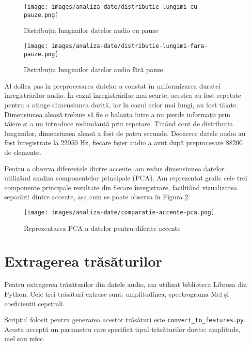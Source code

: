 \begin{figure}
   \begin{minipage}{0.48\textwidth}
     \centering
     \texttt{[image: images/analiza-date/distributie-lungimi-cu-pauze.png]}
     \caption{Distribuția lungimilor datelor audio cu pauze}\label{fig:distribuatiaLungimilor1}
   \end{minipage}\hfill
   \begin{minipage}{0.48\textwidth}
     \centering
     \texttt{[image: images/analiza-date/distributie-lungimi-fara-pauze.png]}
     \caption{Distribuția lungimilor datelor audio fără pauze}\label{fig:distribuatiaLungimilor2}
   \end{minipage}
\end{figure}

Al doilea pas în preprocesarea datelor a constat în uniformizarea duratei înregistrărilor audio. În cazul înregistrărilor mai scurte, acestea au fost repetate pentru a atinge dimensiunea dorită, iar în cazul celor mai lungi, au fost tăiate. Dimensiunea aleasă trebuie să fie o balanța între a nu pierde informații prin tăiere și a nu introduce redundanță prin repetare. Ținând cont de distribuția lungimilor, dimensiunea aleasă a fost de patru secunde. Deoarece datele audio au fost înregistrate la 22050 Hz, fiecare fișier audio a avut după preprocesare 88200 de elemente.

Pentru a observa diferențele dintre accente, am redus dimensiunea datelor utilizând analiza componentelor principale (PCA). Am reprezentat grafic cele trei componente principale rezultate din fiecare înregistrare, facilitând vizualizarea separării dintre accente, așa cum se poate observa în Figura \ref{fig:pca}.

\begin{figure}
\centering
\texttt{[image: images/analiza-date/comparatie-accente-pca.png]}
\caption{Reprezentarea PCA a datelor pentru diferite accente}
\label{fig:pca}
\end{figure}


\section{Extragerea trăsăturilor}

Pentru extragerea trăsăturilor din datele audio, am utilizat biblioteca Librosa din Python. Cele trei trăsături extrase sunt: amplitudinea, spectrograma Mel și coeficienții cepstrali.

Scriptul folosit pentru generarea acestor trăsături este \texttt{convert\_to\_features.py}. Acesta acceptă un parametru care specifică tipul trăsăturilor dorite: amplitude, mel sau mfcc.


